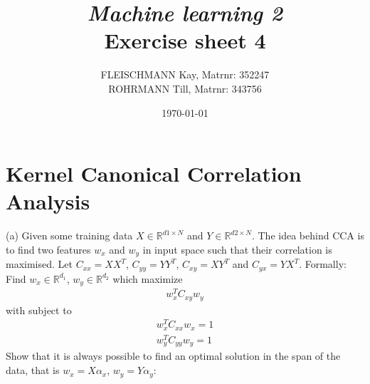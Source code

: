 \documentclass[a4paper, 12pt, titlepage]{article}
\title
{{\em Machine learning 2}\\
Exercise sheet 4}
\author{FLEISCHMANN Kay, Matrnr: 352247\\
	ROHRMANN Till, Matrnr: 343756}
\date{\today}
\begin{document}
\maketitle

\setcounter{section}{5}


\section{Kernel Canonical Correlation Analysis}
(a) Given some training data $X \in \mathbb{R}^{d1 \times N} $ and $Y \in \mathbb{R}^{d2 \times N}$. 
The idea behind CCA is to find two features $w_x$ and $w_y$ in input space such that their correlation is maximised.
Let $C_{xx} = XX^T$, $C_{yy} = YY^T$, $C_{xy} = XY^T$ and $C_{yx} = YX^T$.
\newline \newline
Formally: Find $w_x \in \mathbb{R}^{d_1}$, $w_y \in \mathbb{R}^{d_2}$ which maximize
\begin{eqnarray}
  w^{T}_{x} C_{xy}w_y \label{eq:prob}
 \end{eqnarray}
with subject to
\begin{eqnarray}
  w^T_xC_{xx}w_x=1 \label{eq:constraint1}\\
  w^T_yC_{yy}w_y=1 \label{eq:constraint2}
\end{eqnarray}
Show that it is always possible to find an optimal solution in the span of the data, that is $w_x= X \alpha_x$, $w_y = Y \alpha_y$:
\end{document}
